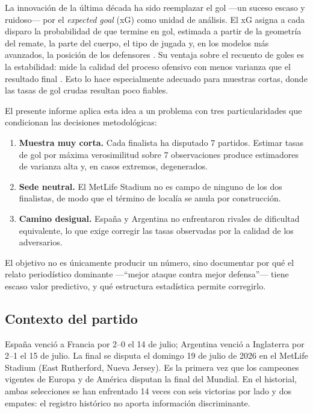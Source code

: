 \documentclass[11pt,a4paper]{article}
\begin{document}
La innovación de la última década ha sido reemplazar el gol ---un suceso escaso y ruidoso--- por el \textit{expected goal} (xG) como unidad de análisis. El xG asigna a cada disparo la probabilidad de que termine en gol, estimada a partir de la geometría del remate, la parte del cuerpo, el tipo de jugada y, en los modelos más avanzados, la posición de los defensores \citep{anzerbauer2021}. Su ventaja sobre el recuento de goles es la estabilidad: mide la calidad del proceso ofensivo con menos varianza que el resultado final \citep{robberechts2020}. Esto lo hace especialmente adecuado para muestras cortas, donde las tasas de gol crudas resultan poco fiables.

El presente informe aplica esta idea a un problema con tres particularidades que condicionan las decisiones metodológicas:

\begin{enumerate}
\item \textbf{Muestra muy corta.} Cada finalista ha disputado 7 partidos. Estimar tasas de gol por máxima verosimilitud sobre 7 observaciones produce estimadores de varianza alta y, en casos extremos, degenerados.
\item \textbf{Sede neutral.} El MetLife Stadium no es campo de ninguno de los dos finalistas, de modo que el término de localía se anula por construcción.
\item \textbf{Camino desigual.} España y Argentina no enfrentaron rivales de dificultad equivalente, lo que exige corregir las tasas observadas por la calidad de los adversarios.
\end{enumerate}

El objetivo no es únicamente producir un número, sino documentar por qué el relato periodístico dominante ---``mejor ataque contra mejor defensa''--- tiene escaso valor predictivo, y qué estructura estadística permite corregirlo.

\subsection{Contexto del partido}

España venció a Francia por 2--0 el 14 de julio; Argentina venció a Inglaterra por 2--1 el 15 de julio. La final se disputa el domingo 19 de julio de 2026 en el MetLife Stadium (East Rutherford, Nueva Jersey). Es la primera vez que los campeones vigentes de Europa y de América disputan la final del Mundial. En el historial, ambas selecciones se han enfrentado 14 veces con seis victorias por lado y dos empates: el registro histórico no aporta información discriminante.
\end{document}
